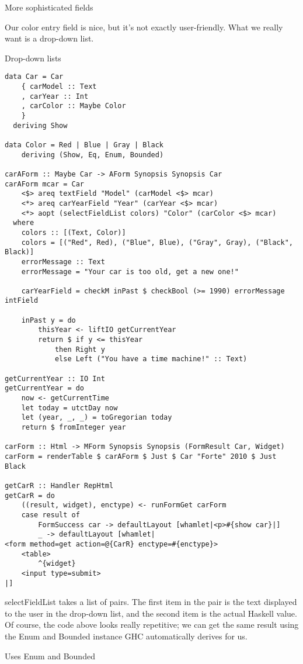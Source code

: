 More sophisticated fields

Our color entry field is nice, but it's not exactly user-friendly. What we really want is a drop-down list.

Drop-down lists

\begin{lstlisting}
data Car = Car
    { carModel :: Text
    , carYear :: Int
    , carColor :: Maybe Color
    }
  deriving Show

data Color = Red | Blue | Gray | Black
    deriving (Show, Eq, Enum, Bounded)

carAForm :: Maybe Car -> AForm Synopsis Synopsis Car
carAForm mcar = Car
    <$> areq textField "Model" (carModel <$> mcar)
    <*> areq carYearField "Year" (carYear <$> mcar)
    <*> aopt (selectFieldList colors) "Color" (carColor <$> mcar)
  where
    colors :: [(Text, Color)]
    colors = [("Red", Red), ("Blue", Blue), ("Gray", Gray), ("Black", Black)]
    errorMessage :: Text
    errorMessage = "Your car is too old, get a new one!"

    carYearField = checkM inPast $ checkBool (>= 1990) errorMessage intField

    inPast y = do
        thisYear <- liftIO getCurrentYear
        return $ if y <= thisYear
            then Right y
            else Left ("You have a time machine!" :: Text)

getCurrentYear :: IO Int
getCurrentYear = do
    now <- getCurrentTime
    let today = utctDay now
    let (year, _, _) = toGregorian today
    return $ fromInteger year

carForm :: Html -> MForm Synopsis Synopsis (FormResult Car, Widget)
carForm = renderTable $ carAForm $ Just $ Car "Forte" 2010 $ Just Black

getCarR :: Handler RepHtml
getCarR = do
    ((result, widget), enctype) <- runFormGet carForm
    case result of
        FormSuccess car -> defaultLayout [whamlet|<p>#{show car}|]
        _ -> defaultLayout [whamlet|
<form method=get action=@{CarR} enctype=#{enctype}>
    <table>
        ^{widget}
    <input type=submit>
|]
\end{lstlisting}

selectFieldList takes a list of pairs. The first item in the pair is the text displayed to the user in the drop-down list, and the second item is the actual Haskell value. Of course, the code above looks really repetitive; we can get the same result using the Enum and Bounded instance GHC automatically derives for us.

Uses Enum and Bounded

